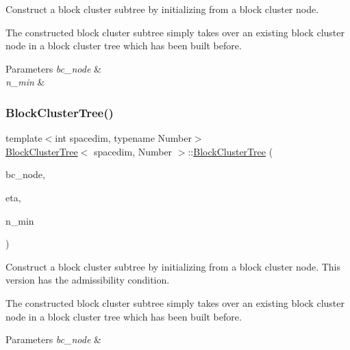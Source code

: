 Construct a block cluster subtree by initializing from a block cluster node.

The constructed block cluster subtree simply takes over an existing block cluster node in a block cluster tree which has been built before.


\begin{DoxyParams}{Parameters}
{\em bc\+\_\+node} & \\
\hline
{\em n\+\_\+min} & \\
\hline
\end{DoxyParams}
\mbox{\label{classBlockClusterTree_a522ad51298f5b58b948e435a9e2d2a40}} 
\subsubsection{\texorpdfstring{Block\+Cluster\+Tree()}{BlockClusterTree()}\hspace{0.1cm}{\footnotesize\ttfamily [5/8]}}
{\footnotesize\ttfamily template$<$int spacedim, typename Number$>$ \\
\hyperlink{classBlockClusterTree}{Block\+Cluster\+Tree}$<$ spacedim, Number $>$\+::\hyperlink{classBlockClusterTree}{Block\+Cluster\+Tree} (\begin{DoxyParamCaption}\item[{\hyperlink{classTreeNode}{node\+\_\+pointer\+\_\+type}}]{bc\+\_\+node,  }\item[{const Number}]{eta,  }\item[{const unsigned int}]{n\+\_\+min }\end{DoxyParamCaption})}

Construct a block cluster subtree by initializing from a block cluster node. This version has the admissibility condition.

The constructed block cluster subtree simply takes over an existing block cluster node in a block cluster tree which has been built before.


\begin{DoxyParams}{Parameters}
{\em bc\+\_\+node} & \\
\hline
\end{DoxyParams}
\mbox{\label{classBlockClusterTree_aefb93288ece0e153eb5843d1df21a2a6}} 
